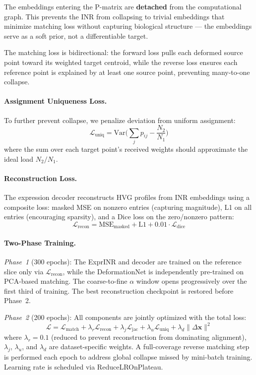 \documentclass[runningheads]{llncs}
\begin{document}
The embeddings entering the P-matrix are \textbf{detached} from the computational graph. This prevents the INR from collapsing to trivial embeddings that minimize matching loss without capturing biological structure --- the embeddings serve as a soft prior, not a differentiable target.

The matching loss is bidirectional: the forward loss pulls each deformed source point toward its weighted target centroid, while the reverse loss ensures each reference point is explained by at least one source point, preventing many-to-one collapse.

\paragraph{Assignment Uniqueness Loss.}
To further prevent collapse, we penalize deviation from uniform assignment:
\begin{equation}
\mathcal{L}_{\text{uniq}} = \text{Var}\Big(\sum_{j} p_{ij} - \frac{N_2}{N_1}\Big)
\end{equation}
where the sum over each target point's received weights should approximate the ideal load $N_2/N_1$.

\paragraph{Reconstruction Loss.}
The expression decoder reconstructs HVG profiles from INR embeddings using a composite loss: masked MSE on nonzero entries (capturing magnitude), L1 on all entries (encouraging sparsity), and a Dice loss on the zero/nonzero pattern:
\begin{equation}
\mathcal{L}_{\text{recon}} = \text{MSE}_{\text{masked}} + \text{L1} + 0.01 \cdot \mathcal{L}_{\text{dice}}
\end{equation}

\paragraph{Two-Phase Training.}
\textit{Phase~1} (300 epochs): The ExprINR and decoder are trained on the reference slice only via $\mathcal{L}_{\text{recon}}$, while the DeformationNet is independently pre-trained on PCA-based matching. The coarse-to-fine $\alpha$ window opens progressively over the first third of training. The best reconstruction checkpoint is restored before Phase~2.

\textit{Phase~2} (200 epochs): All components are jointly optimized with the total loss:
\begin{equation}
\mathcal{L} = \mathcal{L}_{\text{match}} + \lambda_r \mathcal{L}_{\text{recon}} + \lambda_j \mathcal{L}_{\text{jac}} + \lambda_u \mathcal{L}_{\text{uniq}} + \lambda_d \|\Delta\mathbf{x}\|^2
\label{eq:total}
\end{equation}
where $\lambda_r = 0.1$ (reduced to prevent reconstruction from dominating alignment), $\lambda_j$, $\lambda_u$, and $\lambda_d$ are dataset-specific weights. A full-coverage reverse matching step is performed each epoch to address global collapse missed by mini-batch training. Learning rate is scheduled via ReduceLROnPlateau.
\end{document}
